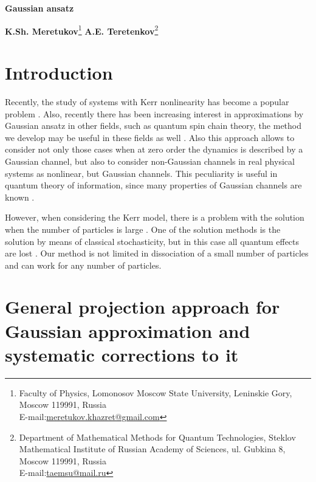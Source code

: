 \documentclass[12pt]{article}
\theoremstyle{definition}
\begin{document}
		\begin{center}
		\Large
		\textbf{Gaussian ansatz}
		
		\large 
		\textbf{K.Sh. Meretukov}\footnote{Faculty of Physics, Lomonosov Moscow State University, Leninskie Gory, Moscow 119991, Russia\\
			E-mail:\href{mailto:meretukov.khazret@gmail.com}{meretukov.khazret@gmail.com}}
		\textbf{A.E. Teretenkov}\footnote{Department of Mathematical Methods for Quantum Technologies, Steklov Mathematical Institute of Russian Academy of Sciences, ul. Gubkina 8, Moscow 119991, Russia\\ E-mail:\href{mailto:taemsu@mail.ru}{taemsu@mail.ru}}
		\\[1mm]
	\end{center}
	
	\footnotesize
	
	\normalsize
	
	\section{\label{sec:introduction}Introduction}
	
	Recently, the study of systems with Kerr nonlinearity has become a popular problem \cite{KerrIntr}. Also, recently there has been increasing interest in approximations by Gaussian ansatz in other fields, such as quantum spin chain theory, the method we develop may be useful in these fields as well \cite{GaussState}. Also this approach allows to consider not only those cases when at zero order the dynamics is described by a Gaussian channel, but also to consider non-Gaussian channels in real physical systems as nonlinear, but Gaussian channels. This peculiarity is useful in quantum theory of information, since many properties of Gaussian channels are known \cite{Kholevo}.
	
	However, when considering the Kerr model, there is a problem with the solution when the number of particles is large \cite{MaslovN}. One of the solution methods is the solution by means of classical stochasticity, but in this case all quantum effects are lost \cite{MaslovSolve}. Our method is not limited in dissociation of a small number of particles and can work for any number of particles.
	
	\section{\label{sec:GeneralApproch}General projection approach for Gaussian approximation and systematic corrections to it}
	
\end{document}
